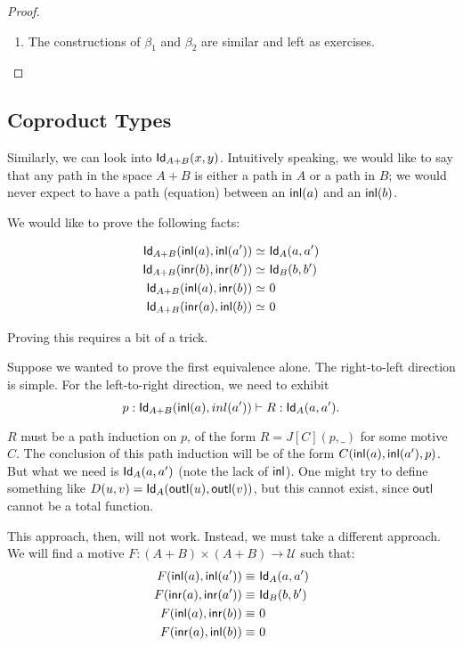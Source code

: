 \documentclass[12pt]{article}
\begin{document}
\begin{proof}
\begin{enumerate}
  
  \item The constructions of $\beta_1$ and $\beta_2$ are similar and left as exercises.
 \end{enumerate}


\end{proof}

\subsection{Coproduct Types}
Similarly, we can look into $\mathsf{Id}_{A+B}(x,y)$. Intuitively speaking, we would like to say that
any path in the space $A+B$ is either a path in $A$ or a path in $B$; we would never expect to have
a path (equation) between an ${\mathsf{inl}}(a)$ and an ${\mathsf{inl}}(b)$.

We would like to prove the following facts:

\begin{align*}
 \mathsf{Id}_{A+B}({\mathsf{inl}}(a),{\mathsf{inl}}(a'))\simeq &\ \mathsf{Id}_{A}(a,a') \\
 \mathsf{Id}_{A+B}({\mathsf{inr}}(b),{\mathsf{inr}}(b'))\simeq &\ \mathsf{Id}_{B}(b,b') \\
 \mathsf{Id}_{A+B}({\mathsf{inl}}(a),{\mathsf{inr}}(b))\simeq &\ 0 \\
 \mathsf{Id}_{A+B}({\mathsf{inr}}(a),{\mathsf{inl}}(b))\simeq &\ 0
\end{align*}

Proving this requires a bit of a trick.

Suppose we wanted to prove the first equivalence alone.
The right-to-left direction is simple. For the left-to-right direction, we need to exhibit
$$p: \mathsf{Id}_{A+B}({\mathsf{inl}}(a),inl(a'))\vdash R:\mathsf{Id}_{A}(a,a').$$

$R$ must be a path induction on $p$, of the form $R=J[C](p,\_)$ for some motive $C$.
The conclusion of this path induction will be of the form $C({\mathsf{inl}}(a),{\mathsf{inl}}(a'),p)$.
But what we need is $\mathsf{Id}_{A}(a,a')$ (note the lack of ${\mathsf{inl}}$). One might try to define
something like $D(u,v)=\mathsf{Id}_{A}(\mathsf{outl}(u),\mathsf{outl}(v))$, but this cannot exist,
since $\mathsf{outl}$ cannot be a total function.

This approach, then, will not work. Instead, we must take a different approach. We will
find a motive $F: (A+B)\times (A+B) \to \mathcal{U}$ such that:
\begin{align*}
 F({\mathsf{inl}}(a),{\mathsf{inl}}(a'))\equiv &\ \mathsf{Id}_{A}(a,a') \\
 F({\mathsf{inr}}(a),{\mathsf{inr}}(a'))\equiv &\ \mathsf{Id}_{B}(b,b') \\
 F({\mathsf{inl}}(a),{\mathsf{inr}}(b)) \equiv &\ 0 \\
 F({\mathsf{inr}}(a),{\mathsf{inl}}(b)) \equiv &\ 0
\end{align*}
\end{document}
